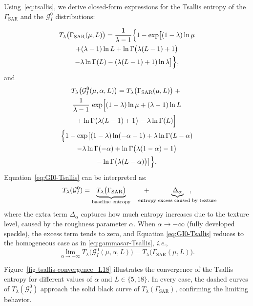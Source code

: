 \documentclass[
  lettersize  journal,
]{IEEEtran}%
\begin{document}
Using~\eqref{eq:tsallis}, we derive closed-form expressions for the
Tsallis entropy of the \(\Gamma_{\mathrm{SAR}}\) and the
\(\mathcal{G}^0_I\) distributions:

\begin{multline}
\label{eq:gammasar-Tsallis}
T_\lambda\bigl(\Gamma_{\mathrm{SAR}}(\mu, L)\bigr)=
\frac{1}{\lambda-1}\Bigl\{1-
\exp\bigl[
(1-\lambda)\ln\mu\\
+(\lambda-1)\ln L
+\ln\Gamma\bigl(\lambda(L-1)+1\bigr) \\
-\lambda\ln\Gamma(L)
-(\lambda(L-1)+1)\ln\lambda
\bigr]\Bigr\}, 
\end{multline} and \begin{multline}
\label{eq:GI0-Tsallis}
  T_\lambda\bigl(\mathcal{G}^0_I(\mu,\alpha,L)\bigr) = T_\lambda\bigl(\Gamma_{\mathrm{SAR}}(\mu, L)\bigr)\;+\;\\
  \frac{1}{\lambda-1}\,
  \exp\Bigl[
  (1-\lambda)\ln\mu
  +(\lambda-1)\ln L\\
  +\ln\Gamma\bigl(\lambda(L-1)+1\bigr)
  -\lambda\ln\Gamma(L)
  \Bigr] \\
  {}\Bigl\{1-
  \exp\bigl[
  (1-\lambda)\ln(-\alpha-1)
  +\lambda\ln\Gamma(L-\alpha)\\
  -\lambda\ln\Gamma(-\alpha) 
  +\ln\Gamma\bigl(\lambda(1-\alpha)-1\bigr)\\
  -\ln\Gamma\bigl(\lambda(L-\alpha)\bigr)
  \bigr]\Bigr\}.
\end{multline} Equation~\eqref{eq:GI0-Tsallis} can be interpreted as:
\begin{equation*}
  T_\lambda(\mathcal{G}^0_I)
  =
  \underbrace{T_\lambda \bigl(\Gamma_{\mathrm{SAR}}\bigr)}_{\text{baseline entropy}}
  \hspace{1.8em} + \hspace{-1.8em}
  \underbrace{\Delta_\alpha}_{\text{entropy excess caused by texture}}\hspace{-4.0em},
\end{equation*} where the extra term \(\Delta_\alpha\) captures how much
entropy increases due to the texture level, caused by the roughness
parameter \(\alpha\). When \(\alpha \to -\infty\) (fully developed
speckle), the excess term tends to zero, and Equation
\eqref{eq:GI0-Tsallis} reduces to the homogeneous case as in
\eqref{eq:gammasar-Tsallis}, \emph{i.e.}, \[
\lim_{\alpha \to -\infty} T_{\lambda}\bigl(\mathcal{G}^0_I(\mu, \alpha, L)\bigr) =  T_{\lambda}\bigl(\Gamma_{\mathrm{SAR}}(\mu, L)\bigr).
\]

Figure~\ref{fig-tsallis-convergence_L18} illustrates the convergence of
the Tsallis entropy for different values of \(\alpha\) and
\(L \in \{5,18\}\). In every case, the dashed curves of
\(T_\lambda(\mathcal{G}^0_I)\) approach the solid black curve of
\(T_\lambda(\Gamma_{\mathrm{SAR}})\), confirming the limiting behavior.
\end{document}
